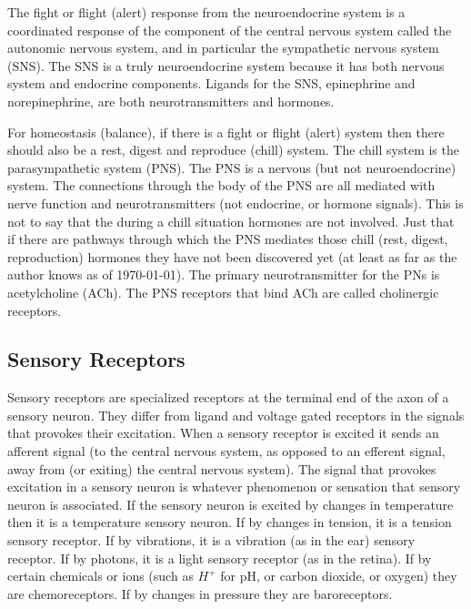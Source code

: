 The fight or flight (alert) response from the neuroendocrine system is a coordinated response of the component of the central nervous system called the autonomic nervous system, and in particular the sympathetic nervous system (SNS). The SNS is a truly neuroendocrine system because it has both nervous system and endocrine components. Ligands for the SNS, epinephrine and norepinephrine, are both neurotransmitters and hormones.

For homeostasis (balance), if there is a fight or flight (alert) system then there should also be a rest, digest and reproduce (chill) system. The chill system is the parasympathetic system (PNS). The PNS is a nervous (but not neuroendocrine) system. The connections through the body of the PNS are all mediated with nerve function and neurotransmitters (not endocrine, or hormone signals). This is not to say that the during a chill situation hormones are not involved. Just that if there are pathways through which the PNS mediates those chill (rest, digest, reproduction) hormones they have not been discovered yet (at least as far as the author knows as of \today). The primary neurotransmitter for the PNs is acetylcholine (ACh). The PNS receptors that bind ACh are called cholinergic receptors. 

\subsection{Sensory Receptors}

Sensory receptors are specialized receptors at the terminal end of the axon of a sensory neuron. They differ from ligand and voltage gated receptors in the signals that provokes their excitation. When a sensory receptor is excited it sends an afferent signal (to the central nervous system, as opposed to an efferent signal, away from (or exiting) the central nervous system). The signal that provokes excitation in a sensory neuron is whatever phenomenon or sensation that sensory neuron is associated. If the sensory neuron is excited by changes in temperature then it is a temperature sensory neuron. If by changes in tension, it is a tension sensory receptor. If by vibrations, it is a vibration (as in the ear) sensory receptor. If by photons, it is a light sensory receptor (as in the retina). If by certain chemicals or ions (such as $H^+$ for pH, or carbon dioxide, or oxygen) they are chemoreceptors. If by changes in pressure they are baroreceptors. 

